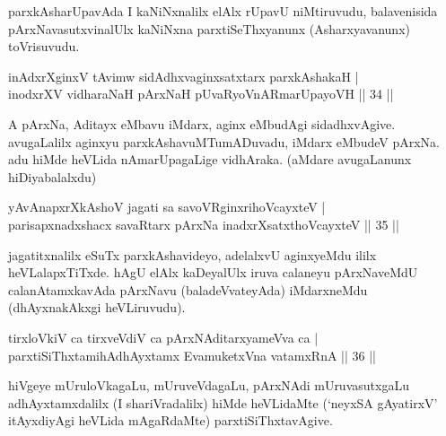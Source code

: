 \begin{artha} 
parxkAsharUpavAda I kaNiNxnalilx elAlx rUpavU niMtiruvudu, 
balavenisida pArxNavasutxvinalUlx kaNiNxna parxtiSeThxyanunx 
(Asharxyavanunx) toVrisuvudu.
\end{artha}


\begin{shl}
inAdxrXginxV tAvimw sidAdhxvaginxsatxtarx parxkAshakaH | \\
inodxrXV vidharaNaH pArxNaH pUvaRyoVnARmarUpayoVH \hfill ||  34 || 
\end{shl}

\begin{artha} 
A pArxNa, Aditayx eMbavu iMdarx, aginx eMbudAgi sidadhxvAgive. 
avugaLalilx aginxyu parxkAshavuMTumADuvadu, iMdarx eMbudeV pArxNa. adu 
hiMde heVLida nAmarUpagaLige vidhAraka. (aMdare avugaLanunx 
hiDiyabalalxdu)
\end{artha}


\begin{shl}
yAvAnapxrXkAshoV jagati sa savoVR\s ginxrihoVcayxteV  | \\
parisapxnadxshacx savaRtarx pArxNa inadxrXsatxthoVcayxteV \hfill ||  35 || 
\end{shl}

\begin{artha} 
jagatitxnalilx eSuTx parxkAshavideyo, adelalxvU aginxyeMdu ililx 
heVLalapxTiTxde. hAgU elAlx kaDeyalUlx iruva calaneyu pArxNaveMdU 
calanAtamxkavAda pArxNavu (baladeVvateyAda) iMdarxneMdu (dhAyxnakAkxgi 
heVLiruvudu).
\end{artha}


\begin{shl}
tirxloVkiV ca tirxveVdiV ca pArxNAditarxyameVva ca | \\
parxtiSiThxtamihAdhAyxtamx EvamuketxVna vatamxRnA \hfill ||  36 || 
\end{shl}

\begin{artha} 
hiVgeye mUruloVkagaLu, mUruveVdagaLu, pArxNAdi mUruvasutxgaLu 
adhAyxtamxdalilx (I shariVradalilx) hiMde heVLidaMte (`neyxSA 
gAyatirxV' itAyxdiyAgi heVLida mAgaRdaMte) parxtiSiThxtavAgive.
\end{artha}

